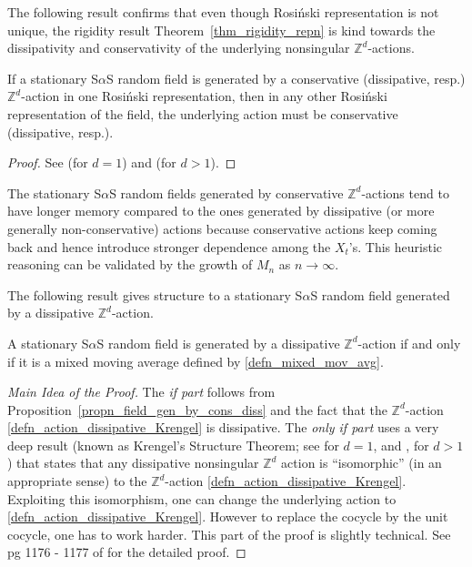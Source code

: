 \documentclass[12pt]{amsart}
\begin{document}
The following result confirms that even though Rosi\'{n}ski representation is not unique, the rigidity result Theorem~\ref{thm_rigidity_repn} is kind towards the dissipativity and conservativity of the underlying nonsingular ${\mathbb{Z}^d}$-actions.

\begin{propn} \label{propn_field_gen_by_cons_diss} If a stationary S$\alpha$S random field is generated by a conservative (dissipative, resp.) ${\mathbb{Z}^d}$-action in one Rosi\'{n}ski representation, then in any other Rosi\'{n}ski representation of the field, the underlying action must be conservative (dissipative, resp.).
\end{propn}

\begin{proof} See \cite{rosinski:1995} (for $d=1$) and \cite{roy:samorodnitsky:2008} (for $d>1$).
\end{proof}

\begin{remark} \label{remark_cons_diss_memory} \textnormal{The stationary S$\alpha$S random fields generated by conservative ${\mathbb{Z}^d}$-actions tend to have longer memory compared to the ones generated by dissipative (or more generally non-conservative) actions because conservative actions keep coming back and hence introduce stronger dependence among the $X_t$'s. This heuristic reasoning can be validated by the growth of $M_n$ as $n \to\infty$.}
\end{remark}

The following result gives structure to a stationary S$\alpha$S random field generated by a dissipative ${\mathbb{Z}^d}$-action.

\begin{thm} \label{thm_diss_mixed_mov_avg} A stationary S$\alpha$S random field is generated by a dissipative ${\mathbb{Z}^d}$-action if and only if it is a mixed moving average defined by \eqref{defn_mixed_mov_avg}.
\end{thm}

\begin{proof} [Main Idea of the Proof] The \emph{if part} follows from Proposition~\ref{propn_field_gen_by_cons_diss} and the fact that the ${\mathbb{Z}^d}$-action \eqref{defn_action_dissipative_Krengel} is dissipative. The \emph{only if part} uses a very deep result (known as Krengel's Structure Theorem; see \cite{krengel:1969} for $d=1$, and \cite{rosinski:2000}, \cite{roy:samorodnitsky:2008} for $d>1$) that states that any dissipative nonsingular ${\mathbb{Z}^d}$ action is ``isomorphic'' (in an appropriate sense) to the ${\mathbb{Z}^d}$-action \eqref{defn_action_dissipative_Krengel}. Exploiting this isomorphism, one can change the underlying action to \eqref{defn_action_dissipative_Krengel}. However to replace the cocycle by the unit cocycle, one has to work harder. This part of the proof is slightly technical. See pg 1176 - 1177 of \cite{rosinski:1995} for the detailed proof.
\end{proof}
\end{document}
